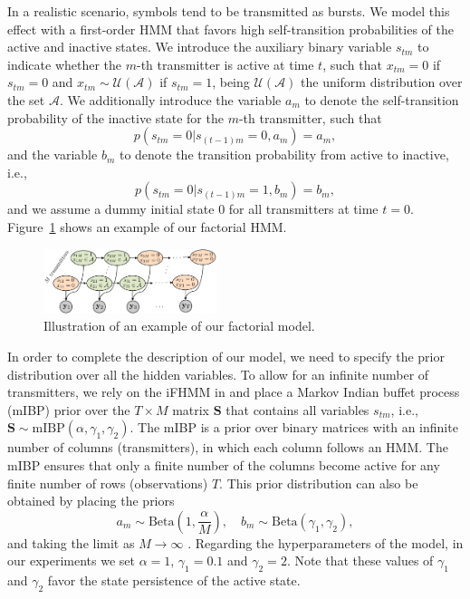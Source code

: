 \documentclass[a4paper]{article}
\def\Sb{\mathbf{S}}
\def\xtm{x_{tm}}
\def\stm{s_{tm}}
\def\Acal{\mathcal{A}}
\def\Ucal{\mathcal{U}}
\begin{document}
In a realistic scenario, symbols tend to be transmitted as bursts. We model this effect with a first-order HMM that favors high self-transition probabilities of the active and inactive states. We introduce the auxiliary binary variable $\stm$ to indicate whether the $m$-th transmitter is active at time $t$, such that $\xtm=0$ if $\stm=0$ and $\xtm\sim\Ucal(\Acal)$ if $\stm=1$, being $\Ucal(\Acal)$ the uniform distribution over the set $\Acal$. We additionally introduce the variable $a_m$ to denote the self-transition probability of the inactive state for the $m$-th transmitter, such that
\begin{equation}
p(\stm=0|s_{(t-1)m}=0,a_m) = a_m,
\end{equation}
and the variable $b_m$ to denote the transition probability from active to inactive, i.e.,
\begin{equation}
p(\stm=0|s_{(t-1)m}=1,b_m) = b_m,
\end{equation}
and we assume a dummy initial state $0$ for all transmitters at time $t=0$. Figure~\ref{fig:modelSketch} shows an example of our factorial HMM.

\begin{figure}[b]
\centering
\includegraphics[width=0.45\textwidth]{figures/modelSketch.pdf}
\caption{Illustration of an example of our factorial model.}\label{fig:modelSketch}
\end{figure}

In order to complete the description of our model, we need to specify the prior distribution over all the hidden variables. To allow for an infinite number of transmitters, we rely on the iFHMM in \cite{IFHMM} and place a Markov Indian buffet process (mIBP) prior over the $T\times M$ matrix $\Sb$ that contains all variables $\stm$, i.e., $\Sb\sim \textrm{mIBP}(\alpha,\gamma_1,\gamma_2)$. The mIBP is a prior over binary matrices with an infinite number of columns (transmitters), in which each column follows an HMM. The mIBP ensures that only a finite number of the columns become active for any finite number of rows (observations) $T$. This prior distribution can also be obtained by placing the priors
\begin{equation}
a_m\sim\textrm{Beta}\left(1,\frac{\alpha}{M}\right),\quad b_m\sim\textrm{Beta}(\gamma_1,\gamma_2),
\end{equation}
and taking the limit as $M\rightarrow\infty$ \cite{IFHMM}. Regarding the hyperparameters of the model, in our experiments we set $\alpha=1$, $\gamma_1=0.1$ and $\gamma_2=2$. Note that these values of $\gamma_1$ and $\gamma_2$ favor the state persistence of the active state.
\end{document}
